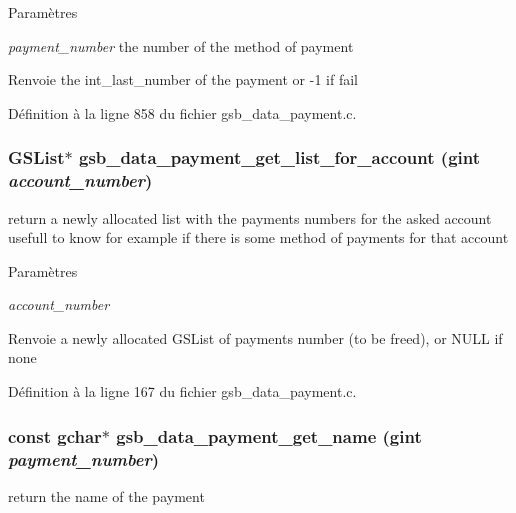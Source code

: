 \begin{DoxyParams}{Paramètres}
\item[{\em payment\_\-number}]the number of the method of payment\end{DoxyParams}
\begin{DoxyReturn}{Renvoie}
the int\_\-last\_\-number of the payment or -\/1 if fail 
\end{DoxyReturn}


Définition à la ligne 858 du fichier gsb\_\-data\_\-payment.c.

\subsubsection[{gsb\_\-data\_\-payment\_\-get\_\-list\_\-for\_\-account}]{\setlength{\rightskip}{0pt plus 5cm}GSList$\ast$ gsb\_\-data\_\-payment\_\-get\_\-list\_\-for\_\-account (gint {\em account\_\-number})}\label{gsb__data__payment_8c_abfa8982981645e91eef08885f26151df}
return a newly allocated list with the payments numbers for the asked account usefull to know for example if there is some method of payments for that account


\begin{DoxyParams}{Paramètres}
\item[{\em account\_\-number}]\end{DoxyParams}
\begin{DoxyReturn}{Renvoie}
a newly allocated GSList of payments number (to be freed), or NULL if none 
\end{DoxyReturn}


Définition à la ligne 167 du fichier gsb\_\-data\_\-payment.c.

\subsubsection[{gsb\_\-data\_\-payment\_\-get\_\-name}]{\setlength{\rightskip}{0pt plus 5cm}const gchar$\ast$ gsb\_\-data\_\-payment\_\-get\_\-name (gint {\em payment\_\-number})}\label{gsb__data__payment_8c_a3384c18af92833d2152faad71ccd16c4}
return the name of the payment


